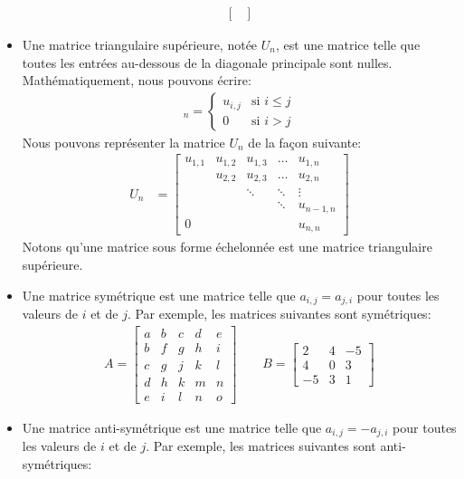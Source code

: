 \documentclass[]{book}
\theoremstyle{definition}
\theoremstyle{definition}
\theoremstyle{definition}
\theoremstyle{remark}
\begin{document}
\begin{itemize}
\begin{align*}
\begin{bmatrix}
  \end{bmatrix}
  \end{align*}
\item
  Une matrice triangulaire supérieure, notée \(U_n\), est une matrice telle que toutes les entrées au-dessous de la diagonale principale sont nulles. Mathématiquement, nous pouvons écrire:
  \begin{align*}
  [u_{i,j}]_n = \begin{cases}
  u_{i,j} & \text{si } i \leq j \\
  0 & \text{si } i > j
  \end{cases} 
  \end{align*}
  Nous pouvons représenter la matrice \(U_n\) de la façon suivante:
  \begin{align*}
  U_n &= \begin{bmatrix}
  u_{1,1} & u_{1,2} & u_{1,3} & \ldots & u_{1,n} \\
  & u_{2,2} & u_{2,3} & \ldots & u_{2,n} \\
  & & \ddots & \ddots & \vdots \\
  & & & \ddots & u_{n-1,n} \\
  0 & & & & u_{n,n}
  \end{bmatrix}
  \end{align*}
  Notons qu'une matrice sous forme échelonnée est une matrice triangulaire supérieure.
\item
  Une matrice symétrique est une matrice telle que \(a_{i,j}=a_{j,i}\) pour toutes les valeurs de \(i\) et de \(j\). Par exemple, les matrices suivantes sont symétriques:
  \begin{align*}
  A = \begin{bmatrix}
  a & b & c & d & e \\
  b & f & g & h & i \\
  c & g & j & k & l \\
  d & h & k & m & n \\
  e & i & l & n & o
  \end{bmatrix}
  \qquad
  B = \begin{bmatrix}
  2 & 4 & -5 \\
  4 & 0 & 3 \\
  -5 & 3 & 1
  \end{bmatrix}
  \end{align*}
\item
  Une matrice anti-symétrique est une matrice telle que \(a_{i,j}=-a_{j,i}\) pour toutes les valeurs de \(i\) et de \(j\). Par exemple, les matrices suivantes sont anti-symétriques:

\end{itemize}
\end{document}
